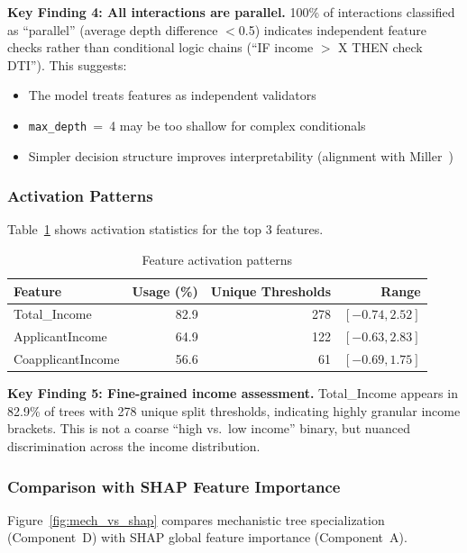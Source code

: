 \textbf{Key Finding 4: All interactions are parallel.}
100\% of interactions classified as ``parallel'' (average depth difference $<$0.5) indicates independent feature checks rather than conditional logic chains (``IF income $>$ X THEN check DTI''). This suggests:
\begin{itemize}
    \item The model treats features as independent validators
    \item \texttt{max\_depth}~=~4 may be too shallow for complex conditionals
    \item Simpler decision structure improves interpretability (alignment with Miller~\cite{miller2019})
\end{itemize}

\subsubsection{Activation Patterns}

Table~\ref{tab:activation} shows activation statistics for the top 3 features.

\begin{table}[htp]
\caption{Feature activation patterns}
\label{tab:activation}
\centering
\begin{tabular}{lrrr}
\toprule
\textbf{Feature} & \textbf{Usage (\%)} & \textbf{Unique Thresholds} & \textbf{Range} \\
\midrule
Total\_Income      & 82.9 & 278 & $[-0.74, 2.52]$ \\
ApplicantIncome    & 64.9 & 122 & $[-0.63, 2.83]$ \\
CoapplicantIncome  & 56.6 &  61 & $[-0.69, 1.75]$ \\
\bottomrule
\end{tabular}
\end{table}

\textbf{Key Finding 5: Fine-grained income assessment.}
Total\_Income appears in 82.9\% of trees with 278 unique split thresholds, indicating highly granular income brackets. This is not a coarse ``high vs.\ low income'' binary, but nuanced discrimination across the income distribution.

\subsubsection{Comparison with SHAP Feature Importance}

Figure~\ref{fig:mech_vs_shap} compares mechanistic tree specialization (Component~D) with SHAP global feature importance (Component~A).

